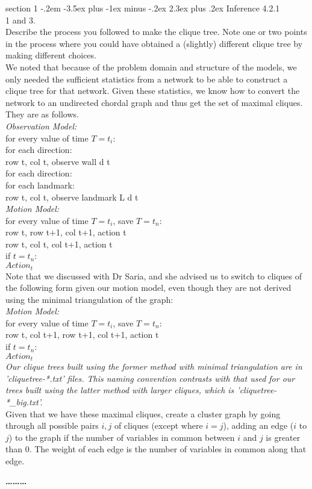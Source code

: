 \documentclass[12pt]{article}
\makeatletter
\newenvironment{problem}{\@startsection
       {section}
       {1}
       {-.2em}
       {-3.5ex plus -1ex minus -.2ex}
       {2.3ex plus .2ex}
       {\pagebreak[3]%
       \large\bf\noindent{Problem }
       }
       }
       {%
       \begin{center}\large\bf \ldots\ldots\ldots\end{center}}
\makeatother
\begin{document}
\begin{problem}{Inference}
4.2.1\\

1 and 3.\\

Describe the process you followed to make the clique tree. Note one or two
points in the process where you could have obtained a (slightly) different clique tree by
making different choices.\\

We noted that because of the problem domain and structure of the models,
we only needed the sufficient statistics from a network to be able to 
construct a clique tree for that network.  Given these statistics, we 
know how to convert the network to an undirected chordal graph and thus
get the set of maximal cliques.  They are as follows. \\
\textit{Observation Model:}\\
for every value of time $T=t_i$:\\
\indent	for each direction:\\
\indent \indent row t, col t, observe wall d t\\
\indent	for each direction:\\
\indent	\indent	for each landmark:\\
\indent	\indent	\indent	row t, col t, observe landmark L d t\\
\textit{Motion Model:}\\
for every value of time $T=t_i$, save $T=t_n$:\\
\indent	row t, row t+1, col t+1, action t\\
\indent	row t, col t, col t+1, action t\\
if $t=t_n$: \\
\indent	$Action_t$ \\

\noindent Note that we discussed with Dr Saria, and she advised us to switch to cliques of the following form given our motion model, even though they are not derived using the minimal triangulation of the graph:\\
\textit{Motion Model:}\\
for every value of time $T=t_i$, save $T=t_n$:\\
\indent	row t, col t+1, row t+1, col t+1, action t\\
if $t=t_n$: \\
\indent	$Action_t$ \\
\textit{Our clique trees built using the former method with minimal triangulation are in 'cliquetree-*.txt' files.  This naming convention contrasts with that used for our trees built using the latter method with larger cliques, which is 'cliquetree-*\_big.txt'.}\\
Given that we have these maximal cliques, create a cluster graph by 
going through all possible pairs $i,j$ of cliques (except where $i=j$), 
adding an edge ($i$ to $j$) to the graph if the number of variables in 
common between $i$ and $j$ is greater than 0.  The weight of each edge is
the number of variables in common along that edge.\\


\end{problem}
\end{document}
